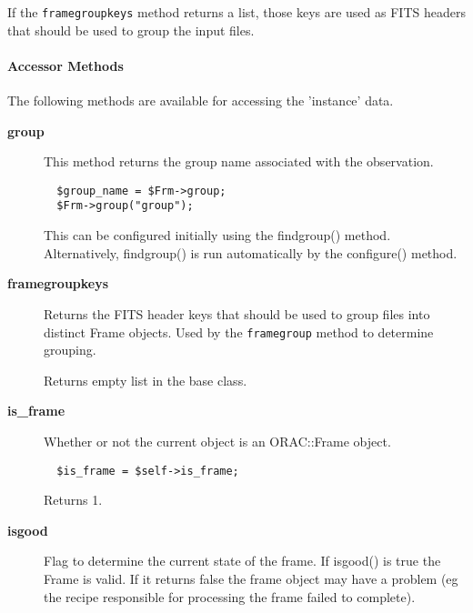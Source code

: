 \begin{description}
If the \texttt{framegroupkeys} method returns a list, those keys
are used as FITS headers that should be used to group the input
files.

\paragraph*{Accessor Methods\label{ORAC::Frame_Accessor_Methods}}


The following methods are available for accessing the
'instance' data.

\begin{description}

\item[{\textbf{group}}] \mbox{}

This method returns the group name associated with the observation.

\begin{verbatim}
  $group_name = $Frm->group;
  $Frm->group("group");
\end{verbatim}


This can be configured initially using the findgroup() method.
Alternatively, findgroup() is run automatically by the configure()
method.


\item[{\textbf{framegroupkeys}}] \mbox{}

Returns the FITS header keys that should be used to group
files into distinct Frame objects. Used by the \texttt{framegroup}
method to determine grouping.



Returns empty list in the base class.


\item[{\textbf{is\_frame}}] \mbox{}

Whether or not the current object is an ORAC::Frame object.

\begin{verbatim}
  $is_frame = $self->is_frame;
\end{verbatim}


Returns 1.


\item[{\textbf{isgood}}] \mbox{}

Flag to determine the current state of the frame. If isgood() is true
the Frame is valid. If it returns false the frame object may have a
problem (eg the recipe responsible for processing the frame failed to
complete).




\end{description}
\end{description}
